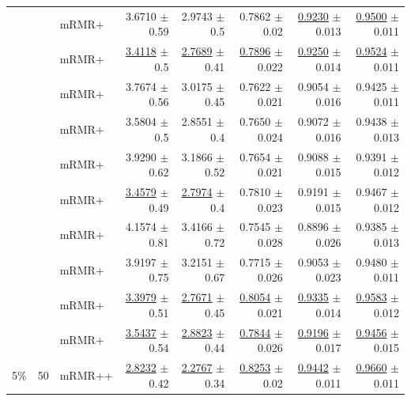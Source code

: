 \begin{longtable}{llp{}rrrrr}
 &  & mRMR+ & 3.6710 {\scriptsize $\pm$ 0.59} & 2.9743 {\scriptsize $\pm$ 0.5} & 0.7862 {\scriptsize $\pm$ 0.02} & \underline{0.9230} {\scriptsize $\pm$ 0.013} & \underline{0.9500} {\scriptsize $\pm$ 0.011} \\
 &  & mRMR+ & \underline{3.4118} {\scriptsize $\pm$ 0.5} & \underline{2.7689} {\scriptsize $\pm$ 0.41} & \underline{0.7896} {\scriptsize $\pm$ 0.022} & \underline{0.9250} {\scriptsize $\pm$ 0.014} & \underline{0.9524} {\scriptsize $\pm$ 0.011} \\
 &  & mRMR+ & 3.7674 {\scriptsize $\pm$ 0.56} & 3.0175 {\scriptsize $\pm$ 0.45} & 0.7622 {\scriptsize $\pm$ 0.021} & 0.9054 {\scriptsize $\pm$ 0.016} & 0.9425 {\scriptsize $\pm$ 0.011} \\
 &  & mRMR+ & 3.5804 {\scriptsize $\pm$ 0.5} & 2.8551 {\scriptsize $\pm$ 0.4} & 0.7650 {\scriptsize $\pm$ 0.024} & 0.9072 {\scriptsize $\pm$ 0.016} & 0.9438 {\scriptsize $\pm$ 0.013} \\
 &  & mRMR+ & 3.9290 {\scriptsize $\pm$ 0.62} & 3.1866 {\scriptsize $\pm$ 0.52} & 0.7654 {\scriptsize $\pm$ 0.021} & 0.9088 {\scriptsize $\pm$ 0.015} & 0.9391 {\scriptsize $\pm$ 0.012} \\
 &  & mRMR+ & \underline{3.4579} {\scriptsize $\pm$ 0.49} & \underline{2.7974} {\scriptsize $\pm$ 0.4} & 0.7810 {\scriptsize $\pm$ 0.023} & 0.9191 {\scriptsize $\pm$ 0.015} & 0.9467 {\scriptsize $\pm$ 0.012} \\
 &  & mRMR+ & 4.1574 {\scriptsize $\pm$ 0.81} & 3.4166 {\scriptsize $\pm$ 0.72} & 0.7545 {\scriptsize $\pm$ 0.028} & 0.8896 {\scriptsize $\pm$ 0.026} & 0.9385 {\scriptsize $\pm$ 0.013} \\
 &  & mRMR+ & 3.9197 {\scriptsize $\pm$ 0.75} & 3.2151 {\scriptsize $\pm$ 0.67} & 0.7715 {\scriptsize $\pm$ 0.026} & 0.9053 {\scriptsize $\pm$ 0.023} & 0.9480 {\scriptsize $\pm$ 0.011} \\
 &  & mRMR+ & \underline{3.3979} {\scriptsize $\pm$ 0.51} & \underline{2.7671} {\scriptsize $\pm$ 0.45} & \underline{0.8054} {\scriptsize $\pm$ 0.021} & \underline{0.9335} {\scriptsize $\pm$ 0.014} & \underline{0.9583} {\scriptsize $\pm$ 0.012} \\
 &  & mRMR+ & \underline{3.5437} {\scriptsize $\pm$ 0.54} & \underline{2.8823} {\scriptsize $\pm$ 0.44} & \underline{0.7844} {\scriptsize $\pm$ 0.026} & \underline{0.9196} {\scriptsize $\pm$ 0.017} & \underline{0.9456} {\scriptsize $\pm$ 0.015} \\
\midrule
5\% & 50 & mRMR++ & \underline{2.8232} {\scriptsize $\pm$ 0.42} & \underline{2.2767} {\scriptsize $\pm$ 0.34} & \underline{0.8253} {\scriptsize $\pm$ 0.02} & \underline{0.9442} {\scriptsize $\pm$ 0.011} & \underline{0.9660} {\scriptsize $\pm$ 0.011} \\

\end{longtable}
